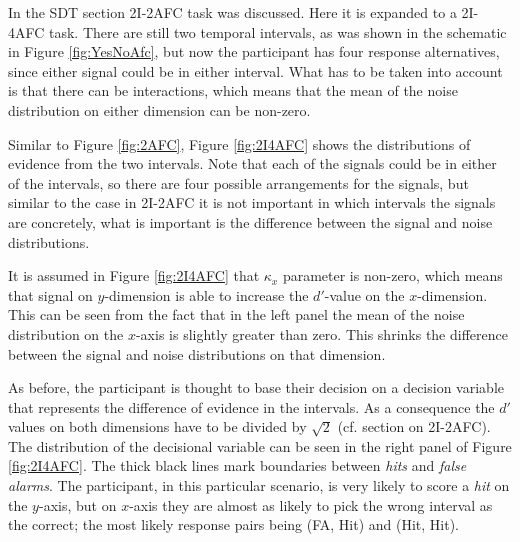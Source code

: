 \documentclass{article}\usepackage{knitr}
\begin{document}
In the SDT section 2I-2AFC task was discussed. Here it is expanded to a 2I-4AFC task. There are still two temporal intervals, as was shown in the schematic in Figure \ref{fig:YesNoAfc}, but now the participant has four response alternatives, since either signal could be in either interval. What has to be taken into account is that there can be interactions, which means that the mean of the noise distribution on either dimension can be non-zero. 

Similar to Figure \ref{fig:2AFC}, Figure \ref{fig:2I4AFC} shows the distributions of evidence from the two intervals. Note that each of the signals could be in either of the intervals, so there are four possible arrangements for the signals, but similar to the case in 2I-2AFC it is not important in which intervals the signals are concretely, what is important is the difference between the signal and noise distributions. 

It is assumed in Figure \ref{fig:2I4AFC} that $\kappa_x$ parameter is non-zero, which means that signal on $y$-dimension is able to increase the $d'$-value on the $x$-dimension. This can be seen from the fact that in the left panel the mean of the noise distribution on the $x$-axis is slightly greater than zero. This shrinks the difference between the signal and noise distributions on that dimension.

As before, the participant is thought to base their decision on a decision variable that represents the difference of evidence in the intervals. As a consequence the $d'$ values on both dimensions have to be divided by $\sqrt{2}$ (cf. section on 2I-2AFC). The distribution of the decisional variable can be seen in the right panel of Figure \ref{fig:2I4AFC}. The thick black lines mark boundaries between \textit{hits} and \textit{false alarms}. The participant, in this particular scenario, is very likely to score a \textit{hit} on the $y$-axis, but on $x$-axis they are almost as likely to pick the wrong interval as the correct; the most likely response pairs being (FA, Hit) and (Hit, Hit).
\end{document}

